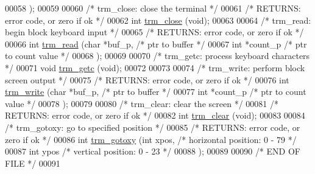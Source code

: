 \begin{DoxyCode}
00058         );
00059 
00060 \textcolor{comment}{/* trm\_close: close the terminal */}
00061 \textcolor{comment}{/*      RETURNS: error code, or zero if ok */}
00062 \textcolor{keywordtype}{int} \hyperlink{trmdrive_8c_a1d9a258c2f0a3e831fa856102e4d7484}{trm_close} (\textcolor{keywordtype}{void});
00063 
00064 \textcolor{comment}{/* trm\_read: begin block keyboard input */}
00065 \textcolor{comment}{/*      RETURNS: error code, or zero if ok */}
00066 \textcolor{keywordtype}{int} \hyperlink{trmdrive_8c_a3de0bf4ec770b397e43b734abd993ce3}{trm_read} (\textcolor{keywordtype}{char} *buf\_p, \textcolor{comment}{/* ptr to buffer */}
00067                 \textcolor{keywordtype}{int} *count\_p \textcolor{comment}{/* ptr to count value */}
00068         );
00069 
00070 \textcolor{comment}{/* trm\_getc: process keyboard characters */}
00071 \textcolor{keywordtype}{void} \hyperlink{trmdrive_8c_a0b41209d0a7740637f03d4033f9ac339}{trm_getc} (\textcolor{keywordtype}{void});
00072 
00073 
00074 \textcolor{comment}{/* trm\_write: perform block screen output */}
00075 \textcolor{comment}{/*      RETURNS: error code, or zero if ok */}
00076 \textcolor{keywordtype}{int} \hyperlink{trmdrive_8c_a348ab00f7a4abfced31c928644335fb6}{trm_write} (\textcolor{keywordtype}{char} *buf\_p, \textcolor{comment}{/* ptr to buffer */}
00077                 \textcolor{keywordtype}{int} *count\_p \textcolor{comment}{/* ptr to count value */}
00078         );
00079 
00080 \textcolor{comment}{/* trm\_clear: clear the screen */}
00081 \textcolor{comment}{/*      RETURNS: error code, or zero if ok */}
00082 \textcolor{keywordtype}{int} \hyperlink{trmdrive_8c_ae586641189b36f988e24e938899d2dee}{trm_clear} (\textcolor{keywordtype}{void});
00083 
00084 \textcolor{comment}{/* trm\_gotoxy: go to specified position */}
00085 \textcolor{comment}{/*      RETURNS: error code, or zero if ok */}
00086 \textcolor{keywordtype}{int} \hyperlink{trmdrive_8c_a041851ec0fe17185a897a43597fb146a}{trm_gotoxy} (\textcolor{keywordtype}{int} xpos, \textcolor{comment}{/* horizontal position: 0 - 79 */}
00087                 \textcolor{keywordtype}{int} ypos  \textcolor{comment}{/* vertical position: 0 - 23 */}
00088         );
00089 
00090 \textcolor{comment}{/* END OF FILE */}
00091 
\end{DoxyCode}
